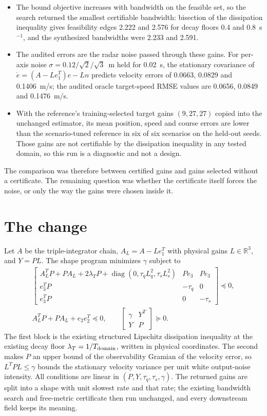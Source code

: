 \documentclass[11pt]{article}
\begin{document}
\begin{itemize}
\item The bound objective increases with bandwidth on the feasible set, so
the search returned the smallest certifiable bandwidth: bisection of the
dissipation inequality gives feasibility edges 2.222 and 2.576 for decay
floors 0.4 and 0.8~s$^{-1}$, and the synthesized bandwidths were 2.233 and
2.591.
\item The audited errors are the radar noise passed through these gains. For
per-axis noise $\sigma=0.12/\sqrt2/\sqrt3$~m held for 0.02~s, the stationary
covariance of $\dot e=(A-Le_1^T)e-Ln$ predicts velocity errors of 0.0663,
0.0829 and 0.1406~m/s; the audited oracle target-speed RMSE values are
0.0656, 0.0849 and 0.1476~m/s.
\item With the reference's training-selected target gains $(9,27,27)$ copied
into the unchanged estimator, its mean position, speed and course errors are
lower than the scenario-tuned reference in six of six scenarios on the
held-out seeds. Those gains are not certifiable by the dissipation inequality
in any tested domain, so this run is a diagnostic and not a design.
\end{itemize}

The comparison was therefore between certified gains and gains selected
without a certificate. The remaining question was whether the certificate
itself forces the noise, or only the way the gains were chosen inside it.

\section{The change}
Let $A$ be the triple-integrator chain, $A_L=A-Le_1^T$ with physical gains
$L\in\mathbb R^3$, and $Y=PL$. The shape program minimizes $\gamma$ subject to
\begin{gather*}
\begin{bmatrix}
A_L^TP+PA_L+2\lambda_TP+\operatorname{diag}(0,\tau_qL_q^2,\tau_sL_s^2)&Pe_3&Pe_3\\
e_3^TP&-\tau_q&0\\ e_3^TP&0&-\tau_s
\end{bmatrix}\preceq0,\\
A_L^TP+PA_L+e_2e_2^T\preceq0,\qquad
\begin{bmatrix}\gamma&Y^T\\Y&P\end{bmatrix}\succeq0 .
\end{gather*}
The first block is the existing structured Lipschitz dissipation inequality
at the existing decay floor $\lambda_T=1/T_{\rm domain}$, written in physical
coordinates. The second makes $P$ an upper bound of the observability Gramian
of the velocity error, so $L^TPL\le\gamma$ bounds the stationary velocity
variance per unit white output-noise intensity. All conditions are linear in
$(P,Y,\tau_q,\tau_s,\gamma)$. The returned gains are split into a shape with
unit slowest rate and that rate; the existing bandwidth search and
free-metric certificate then run unchanged, and every downstream field keeps
its meaning.
\end{document}

